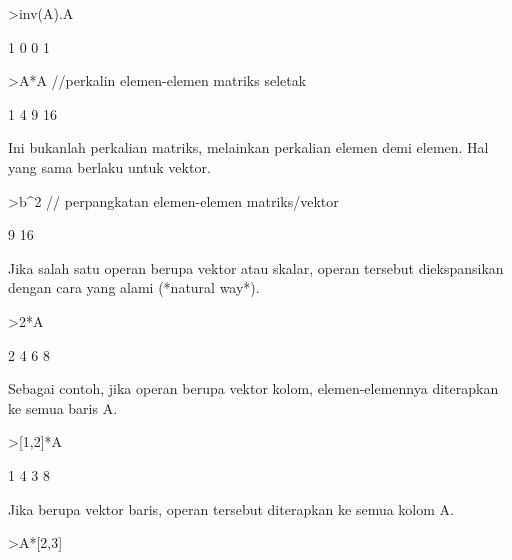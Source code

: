 \documentclass{article}
\newenvironment{eulernotebook}{\par}{\par}
\newenvironment{eulercomment}{\par\medskip}{\par\medskip}
\begin{document}
\begin{eulernotebook}
\begin{eulercomment}
\begin{eulercomment}
\begin{eulercomment}
\begin{eulercomment}
\begin{eulerprompt}
>inv(A).A
\end{eulerprompt}
\begin{euleroutput}
              1             0 
              0             1 
\end{euleroutput}
\begin{eulerprompt}
>A*A //perkalin elemen-elemen matriks seletak
\end{eulerprompt}
\begin{euleroutput}
              1             4 
              9            16 
\end{euleroutput}
\begin{eulercomment}
Ini bukanlah perkalian matriks, melainkan perkalian elemen demi
elemen. Hal yang sama berlaku untuk vektor.
\end{eulercomment}
\begin{eulerprompt}
>b^2 // perpangkatan elemen-elemen matriks/vektor
\end{eulerprompt}
\begin{euleroutput}
              9 
             16 
\end{euleroutput}
\begin{eulercomment}
Jika salah satu operan berupa vektor atau skalar, operan tersebut
diekspansikan dengan cara yang alami (*natural way*).
\end{eulercomment}
\begin{eulerprompt}
>2*A
\end{eulerprompt}
\begin{euleroutput}
              2             4 
              6             8 
\end{euleroutput}
\begin{eulercomment}
Sebagai contoh, jika operan berupa vektor kolom, elemen-elemennya
diterapkan ke semua baris A.
\end{eulercomment}
\begin{eulerprompt}
>[1,2]*A
\end{eulerprompt}
\begin{euleroutput}
              1             4 
              3             8 
\end{euleroutput}
\begin{eulercomment}
Jika berupa vektor baris, operan tersebut diterapkan ke semua kolom A.
\end{eulercomment}
\begin{eulerprompt}
>A*[2,3]
\end{eulerprompt}
\begin{euleroutput}

\end{euleroutput}
\end{eulercomment}
\end{eulercomment}
\end{eulercomment}
\end{eulercomment}
\end{eulernotebook}
\end{document}
